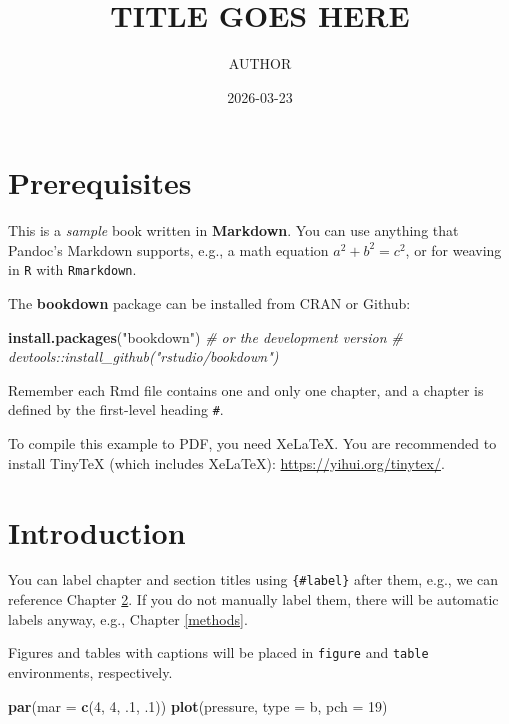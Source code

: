 \documentclass[
]{book}
\title{TITLE GOES HERE}
\author{AUTHOR}
\date{2026-03-23}
\newenvironment{Shaded}{\begin{snugshade}}{\end{snugshade}}
\newcommand{\AttributeTok}[1]{\textcolor[rgb]{0.13,0.29,0.53}{#1}}
\newcommand{\CommentTok}[1]{\textcolor[rgb]{0.56,0.35,0.01}{\textit{#1}}}
\newcommand{\DecValTok}[1]{\textcolor[rgb]{0.00,0.00,0.81}{#1}}
\newcommand{\FunctionTok}[1]{\textcolor[rgb]{0.13,0.29,0.53}{\textbf{#1}}}
\newcommand{\NormalTok}[1]{#1}
\newcommand{\StringTok}[1]{\textcolor[rgb]{0.31,0.60,0.02}{#1}}
\begin{document}
\maketitle

{
\setcounter{tocdepth}{1}
\tableofcontents
}
\hypertarget{prerequisites}{%
\chapter{Prerequisites}\label{prerequisites}}

This is a \emph{sample} book written in \textbf{Markdown}. You can use anything that Pandoc's Markdown supports, e.g., a math equation \(a^2 + b^2 = c^2\), or for weaving in \texttt{R} with \texttt{Rmarkdown}.

The \textbf{bookdown} package can be installed from CRAN or Github:

\begin{Shaded}
\begin{Highlighting}[]
\FunctionTok{install.packages}\NormalTok{(}\StringTok{"bookdown"}\NormalTok{)}
\CommentTok{\# or the development version}
\CommentTok{\# devtools::install\_github("rstudio/bookdown")}
\end{Highlighting}
\end{Shaded}

Remember each Rmd file contains one and only one chapter, and a chapter is defined by the first-level heading \texttt{\#}.

To compile this example to PDF, you need XeLaTeX. You are recommended to install TinyTeX (which includes XeLaTeX): \url{https://yihui.org/tinytex/}.

\hypertarget{intro}{%
\chapter{Introduction}\label{intro}}

You can label chapter and section titles using \texttt{\{\#label\}} after them, e.g., we can reference Chapter \ref{intro}. If you do not manually label them, there will be automatic labels anyway, e.g., Chapter \ref{methods}.

Figures and tables with captions will be placed in \texttt{figure} and \texttt{table} environments, respectively.

\begin{Shaded}
\begin{Highlighting}[]
\FunctionTok{par}\NormalTok{(}\AttributeTok{mar =} \FunctionTok{c}\NormalTok{(}\DecValTok{4}\NormalTok{, }\DecValTok{4}\NormalTok{, .}\DecValTok{1}\NormalTok{, .}\DecValTok{1}\NormalTok{))}
\FunctionTok{plot}\NormalTok{(pressure, }\AttributeTok{type =} \StringTok{\textquotesingle{}b\textquotesingle{}}\NormalTok{, }\AttributeTok{pch =} \DecValTok{19}\NormalTok{)}
\end{Highlighting}
\end{Shaded}
\end{document}
